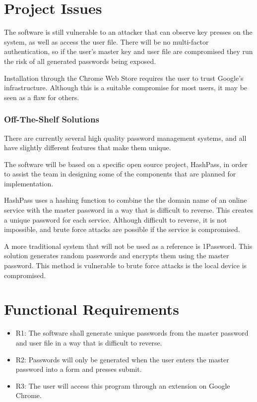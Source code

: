\documentclass[12pt]{article}
\begin{document}
\section{Project Issues}
The software is still vulnerable to an attacker that can observe key presses on the system, as well as access the user file. There will be no multi-factor authentication, so if the user's master key and user file are compromised they run the risk of all generated passwords being exposed.

Installation through the Chrome Web Store requires the user to trust Google's infrastructure. Although this is a suitable compromise for most users, it may be seen as a flaw for others.

\subsubsection{Off-The-Shelf Solutions}
There are currently several high quality password management systems, and all have slightly different features that make them unique. \newline

The software will be based on a specific open source project, HashPass, in order to assist the team in designing some of the components that are planned for implementation. \newline

HashPass uses a hashing function to combine the the domain name of an online service with the master password in a way that is difficult to reverse. This creates a unique password for each service. Although difficult to reverse, it is not impossible, and brute force attacks are possible if the service is compromised. \newline

A more traditional system that will not be used as a reference is 1Password. This solution generates random passwords and encrypts them using the master password. This method is vulnerable to brute force attacks is the local device is compromised.

\section{Functional Requirements}

\begin{itemize}
\item R1: The software shall generate unique passwords from the master password and user file in a way that is difficult to reverse.
\item R2: Passwords will only be generated when the user enters the master password into a form and presses submit.
\item R3: The user will access this program through an extension on Google Chrome.
\end{itemize}
\end{document}
